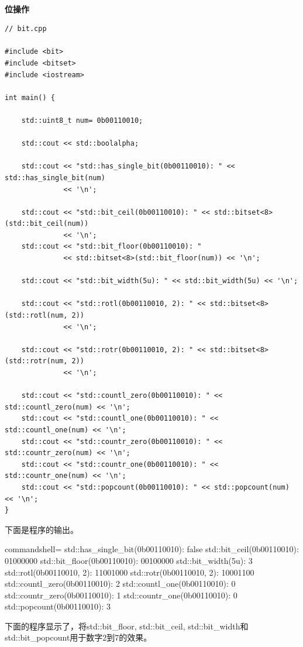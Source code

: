\hspace*{\fill} \\ %
\noindent
\textbf{位操作}
\begin{lstlisting}[style=styleCXX]
// bit.cpp

#include <bit>
#include <bitset>
#include <iostream>

int main() {
	
	std::uint8_t num= 0b00110010;
	
	std::cout << std::boolalpha;
	
	std::cout << "std::has_single_bit(0b00110010): " << std::has_single_bit(num)
	          << '\n';
	          
	std::cout << "std::bit_ceil(0b00110010): " << std::bitset<8>(std::bit_ceil(num))
	          << '\n';          
	std::cout << "std::bit_floor(0b00110010): "
	          << std::bitset<8>(std::bit_floor(num)) << '\n';
	
	std::cout << "std::bit_width(5u): " << std::bit_width(5u) << '\n';
	
	std::cout << "std::rotl(0b00110010, 2): " << std::bitset<8>(std::rotl(num, 2))
	          << '\n';
	
	std::cout << "std::rotr(0b00110010, 2): " << std::bitset<8>(std::rotr(num, 2))
	          << '\n';
	          
	std::cout << "std::countl_zero(0b00110010): " << std::countl_zero(num) << '\n';
	std::cout << "std::countl_one(0b00110010): " << std::countl_one(num) << '\n';
	std::cout << "std::countr_zero(0b00110010): " << std::countr_zero(num) << '\n';
	std::cout << "std::countr_one(0b00110010): " << std::countr_one(num) << '\n';
	std::cout << "std::popcount(0b00110010): " << std::popcount(num) << '\n';
}
\end{lstlisting}

下面是程序的输出。

\begin{tcblisting}{commandshell={}}
std::has_single_bit(0b00110010): false
std::bit_ceil(0b00110010): 01000000
std::bit_floor(0b00110010): 00100000
std::bit_width(5u): 3
std::rotl(0b00110010, 2): 11001000
std::rotr(0b00110010, 2): 10001100
std::countl_zero(0b00110010): 2
std::countl_one(0b00110010): 0
std::countr_zero(0b00110010): 1
std::countr_one(0b00110010): 0
std::popcount(0b00110010): 3
\end{tcblisting}

下面的程序显示了，将std::bit\_floor, std::bit\_ceil, std::bit\_width和std::bit\_popcount用于数字2到7的效果。

